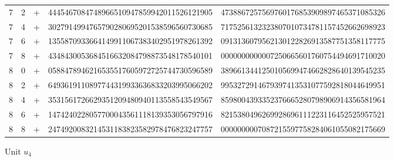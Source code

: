 \begin{longtable}{rrrll}
7 & 2 & + & 4445467084748966510947859942011526121905 & 4738867257569760176853909897465371085326 \\
7 & 4 & + & 3027914994765790280695201538596560730685 & 7175256132323807010734781157452662698923 \\
7 & 6 & + & 1355870933664149911067383402951978261392 & 0913136079562130122826913587751358117775 \\
7 & 8 & + & 4348430053684516632084798873548178540101 & 0000000000007250665601760754494691710020 \\
8 & 0 & + & 0588478946216535517605972725744730596589 & 3896613441250105699474662828640139545235 \\
8 & 2 & + & 6493619110897744319933636833203995066202 & 9953272914679397413531077592818044649951 \\
8 & 4 & + & 3531561726629351209480940113558543549567 & 8598004393352376665280798906914356581964 \\
8 & 6 & + & 1474240228057700043561118139353056797916 & 8215380496269928696111223116452525957521 \\
8 & 8 & + & 2474920083214531183823582978476823247757 & 0000000007087215597758284061055082175669 \\
\end{longtable}
\par\medskip\normalfont\normalsize Unit $u_4$\par\smallskip
\fontsize{7.6}{9.2}\selectfont\ttfamily
